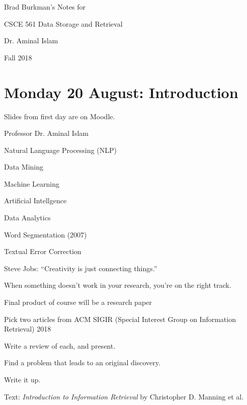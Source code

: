\documentclass[11pt]{article}
\begin{document}
\setlength{\parindent}{0pt}
\begin{spacing}{1.2}

%
%

Brad Burkman's Notes for

\qquad CSCE 561 Data Storage and Retrieval

\qquad Dr. Aminal Islam

\qquad Fall 2018

\vskip 12pt

\tableofcontents

\section{Monday 20 August:  Introduction}

Slides from first day are on Moodle.  

\vskip 12pt

Professor Dr. Aminal Islam

\qquad Natural Language Processing (NLP)

\qquad Data Mining

\qquad Machine Learning 

\qquad Artificial Intellgence

\qquad Data Analytics

\qquad Word Segmentation (2007)

\qquad Textual Error Correction

\vskip 12pt

Steve Jobs:  ``Creativity is just connecting things.''

\qquad

When something doesn't work in your research, you're on the right track.  

\vskip 12pt

Final product of course will be a research paper

\qquad Pick two articles from ACM SIGIR (Special Interest Group on Information Retrieval) 2018

\qquad Write a review of each, and present.

\qquad Find a problem that leads to an original discovery.  

\qquad Write it up.

\vskip 12pt

Text:  {\it Introduction to Information Retrieval} by Christopher D. Manning et al. 


\end{spacing}
\end{document}
